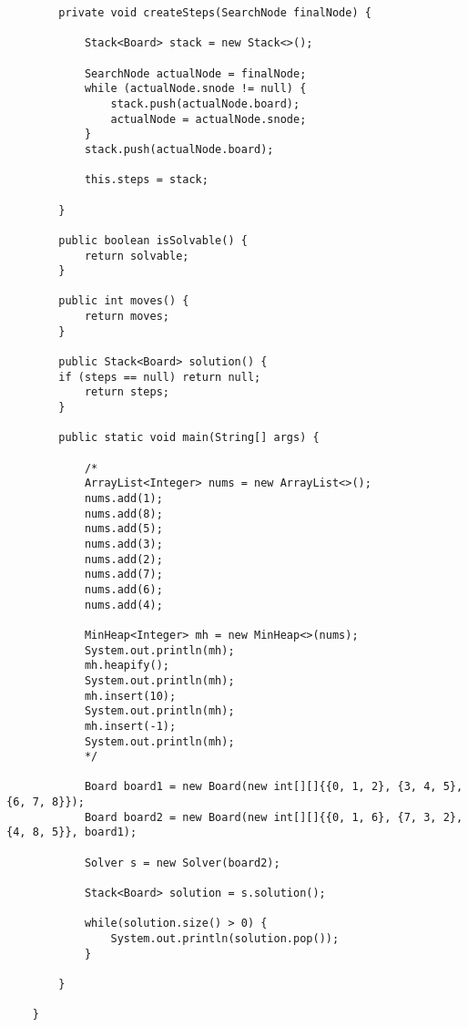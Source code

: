\documentclass[paper=a4, fontsize=11pt]{scrartcl} %
\numberwithin{equation}{section} %
\numberwithin{figure}{section} %
\numberwithin{table}{section} %
\begin{document}
\begin{lstlisting}
        private void createSteps(SearchNode finalNode) {

            Stack<Board> stack = new Stack<>();

            SearchNode actualNode = finalNode;
            while (actualNode.snode != null) {
                stack.push(actualNode.board);
                actualNode = actualNode.snode;
            }
            stack.push(actualNode.board);

            this.steps = stack;

        }

        public boolean isSolvable() {
            return solvable;
        }

        public int moves() {
            return moves;
        }

        public Stack<Board> solution() {
        if (steps == null) return null;
            return steps;
        }

        public static void main(String[] args) {

            /*
            ArrayList<Integer> nums = new ArrayList<>();
            nums.add(1);
            nums.add(8);
            nums.add(5);
            nums.add(3);
            nums.add(2);
            nums.add(7);
            nums.add(6);
            nums.add(4);

            MinHeap<Integer> mh = new MinHeap<>(nums);
            System.out.println(mh);
            mh.heapify();
            System.out.println(mh);
            mh.insert(10);
            System.out.println(mh);
            mh.insert(-1);
            System.out.println(mh);
            */

            Board board1 = new Board(new int[][]{{0, 1, 2}, {3, 4, 5}, {6, 7, 8}});
            Board board2 = new Board(new int[][]{{0, 1, 6}, {7, 3, 2}, {4, 8, 5}}, board1);

            Solver s = new Solver(board2);

            Stack<Board> solution = s.solution();

            while(solution.size() > 0) {
                System.out.println(solution.pop());
            }

        }

    }

    \end{lstlisting}



\end{document}
